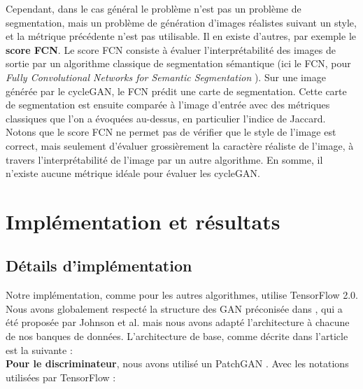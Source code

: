 Cependant, dans le cas général le problème n'est pas un problème de segmentation, mais un problème de génération d'images réalistes suivant un style, et la métrique précédente n'est pas utilisable. Il en existe d'autres, par exemple le \textbf{score FCN}. Le score FCN consiste à évaluer l'interprétabilité des images de sortie par un algorithme classique de segmentation sémantique (ici le FCN, pour \textit{Fully Convolutional Networks for Semantic Segmentation} \cite{long_fully_2014}). Sur une image générée par le cycleGAN, le FCN prédit une carte de segmentation. Cette carte de segmentation est ensuite comparée à l’image d’entrée avec des métriques classiques que l'on a évoquées au-dessus, en particulier l'indice de Jaccard.\\
Notons que le score FCN ne permet pas de vérifier que le style de l'image est correct, mais seulement d'évaluer grossièrement la caractère réaliste de l'image, à travers l'interprétabilité de l'image par un autre algorithme. En somme, il n'existe aucune métrique idéale pour évaluer les cycleGAN.


\section{Implémentation et résultats}

\subsection{Détails d'implémentation}

Notre implémentation, comme pour les autres algorithmes, utilise TensorFlow 2.0. Nous avons globalement respecté la structure des GAN préconisée dans \cite{zhu_unpaired_2018}, qui a été proposée par Johnson  et  al. \cite{johnson_perceptual_2016} mais nous avons adapté l'architecture à chacune de nos banques de données. L'architecture de base, comme décrite dans l'article est la suivante : \\

\textbf{Pour le discriminateur}, nous avons utilisé un PatchGAN \cite{isola_image--image_2018-3}. Avec les notations utilisées par TensorFlow :


